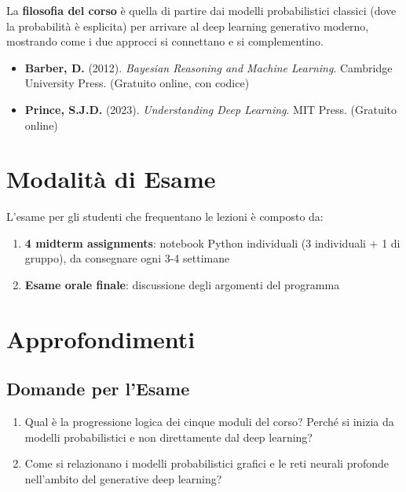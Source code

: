 La \textbf{filosofia del corso} è quella di partire dai modelli probabilistici classici (dove la probabilità è esplicita) per arrivare al deep learning generativo moderno, mostrando come i due approcci si connettano e si complementino.

\begin{tcolorbox}[title=Riferimenti Bibliografici]
\begin{itemize}
    \item \textbf{Barber, D.} (2012). \textit{Bayesian Reasoning and Machine Learning}. Cambridge University Press. (Gratuito online, con codice)
    \item \textbf{Prince, S.J.D.} (2023). \textit{Understanding Deep Learning}. MIT Press. (Gratuito online)
\end{itemize}
\end{tcolorbox}

\section{Modalità di Esame}

L'esame per gli studenti che frequentano le lezioni è composto da:
\begin{enumerate}
    \item \textbf{4 midterm assignments}: notebook Python individuali (3 individuali + 1 di gruppo), da consegnare ogni 3-4 settimane
    \item \textbf{Esame orale finale}: discussione degli argomenti del programma
\end{enumerate}

\section{Approfondimenti}
\subsection{Domande per l'Esame}
\begin{enumerate}
    \item Qual è la progressione logica dei cinque moduli del corso? Perché si inizia da modelli probabilistici e non direttamente dal deep learning?
    \item Come si relazionano i modelli probabilistici grafici e le reti neurali profonde nell'ambito del generative deep learning?
\end{enumerate}

